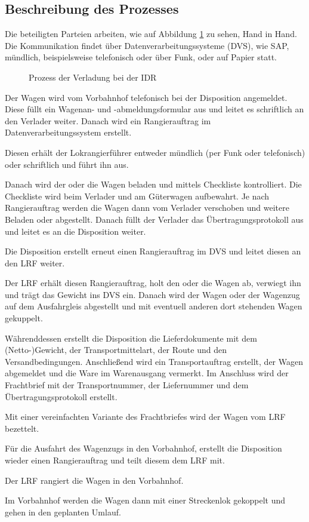 \subsection{Beschreibung des Prozesses}
Die beteiligten Parteien arbeiten, wie auf Abbildung \ref{fig:IDR_Warenausgang} zu sehen, Hand in Hand. Die Kommunikation findet über Datenverarbeitungssysteme (\acrshort{DVS}), wie SAP, mündlich, beispielsweise telefonisch oder über Funk, oder auf Papier statt.\par
\begin{figure}
    \centering
    
    \caption{Prozess der Verladung bei der IDR}
    \label{fig:IDR_Warenausgang}
\end{figure}
Der Wagen wird vom Vorbahnhof telefonisch bei der Disposition angemeldet. Diese füllt ein Wagenan- und -abmeldungsformular aus und leitet es schriftlich an den Verlader weiter. Danach wird ein Rangierauftrag im Datenverarbeitungssystem erstellt.\par
Diesen erhält der Lokrangierführer entweder mündlich (per Funk oder telefonisch) oder schriftlich und führt ihn aus.\par
Danach wird der oder die Wagen beladen und mittels Checkliste kontrolliert. Die Checkliste wird beim Verlader und am Güterwagen aufbewahrt. Je nach Rangierauftrag werden die Wagen dann vom Verlader verschoben und weitere Beladen oder abgestellt. Danach füllt der Verlader das Übertragungsprotokoll aus und leitet es an die Disposition weiter.\par
Die Disposition erstellt erneut einen Rangierauftrag im DVS und leitet diesen an den \acrshort{LRF} weiter.\par
Der \acrshort{LRF} erhält diesen Rangierauftrag, holt den oder die Wagen ab, verwiegt ihn und trägt das Gewicht ins DVS ein. Danach wird der Wagen oder der \gls{Wagenzug} auf dem Ausfahrgleis abgestellt und mit eventuell anderen dort stehenden Wagen gekuppelt.\par
Währenddessen erstellt die Disposition die Lieferdokumente mit dem (Netto-)Gewicht, der Transportmittelart, der Route und den Versandbedingungen. Anschließend wird ein Transportauftrag erstellt, der Wagen abgemeldet und die Ware im Warenausgang vermerkt. Im Anschluss wird der Frachtbrief mit der Transportnummer, der Liefernummer und dem Übertragungsprotokoll erstellt.\par
Mit einer vereinfachten Variante des Frachtbriefes wird der Wagen vom \acrshort{LRF} bezettelt.\par
Für die Ausfahrt des \gls{Wagenzug}s in den Vorbahnhof, erstellt die Disposition wieder einen Rangierauftrag und teilt diesem dem \acrshort{LRF} mit.\par
Der \acrshort{LRF} rangiert die Wagen in den Vorbahnhof.\par
Im Vorbahnhof werden die Wagen dann mit einer Streckenlok gekoppelt und gehen in den geplanten Umlauf.

